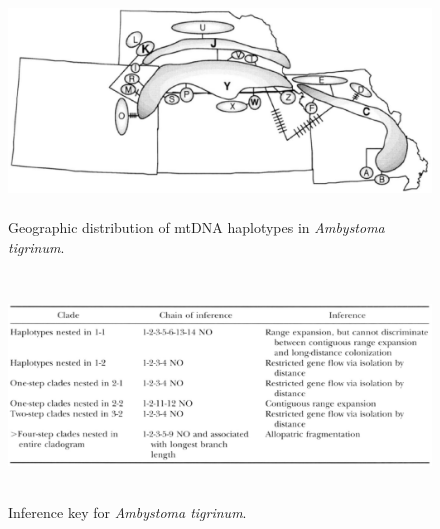 \documentclass[12pt]{article}
\begin{document}
\begin{figure}
\begin{center}
\includegraphics[height=6cm]{ambystoma.eps}
\end{center}
\caption{Geographic distribution of mtDNA haplotypes in {\it Ambystoma
    tigrinum}.}\label{fig:ambystoma}
\end{figure}

\begin{figure}
\begin{center}
\includegraphics[height=6cm]{ambystoma-inference.eps}
\end{center}
\caption{Inference key for {\it Ambystoma
    tigrinum}.}\label{fig:ambystoma-inference}
\end{figure}




\ccLicense
\end{document}
